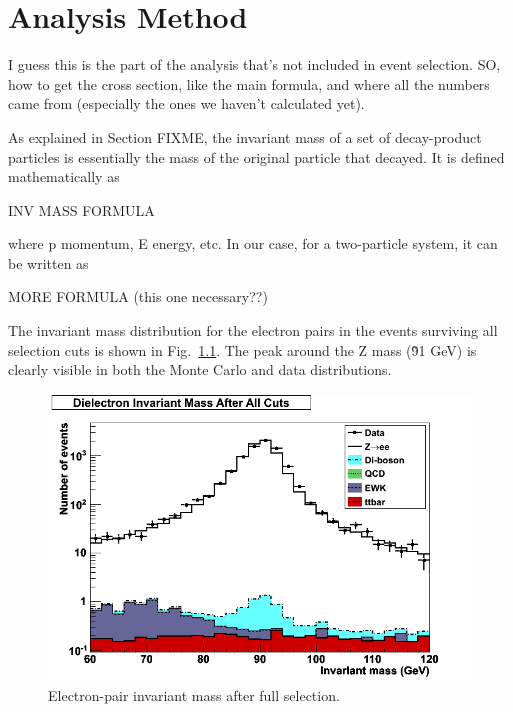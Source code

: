 \chapter{Analysis Method}
I guess this is the part of the analysis that's not included in event selection.  
SO, how to get the cross section, like the main formula, 
and where all the numbers came from (especially the ones we haven't calculated yet).


As explained in Section FIXME, 
the invariant mass of a set of decay-product particles is 
essentially the mass of the original particle that decayed. 
It is defined mathematically as 

INV MASS FORMULA

where p momentum, E energy, etc. 
In our case, for a two-particle system, it can be written as 

MORE FORMULA (this one necessary??)

The invariant mass distribution for the electron pairs 
in the events surviving all selection cuts is shown in 
Fig.~\ref{fig:InvMass}.  
The peak around the Z mass (\~91 GeV) is clearly visible 
in both the Monte Carlo and data distributions.  



 \begin{figure}[htb]
  \begin{center}
    \includegraphics[width=360pt]{Figures/invMass-04Apr11.png}
  \end{center}
  \caption[Electron-pair invariant mass after full selection]{Electron-pair invariant mass after full selection.}
  \label{fig:InvMass}
 \end{figure}


